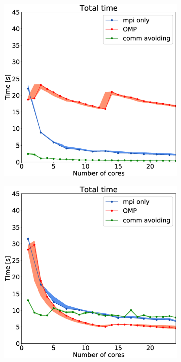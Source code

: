 \begin{figure}
\begin{subfigure}[c]{0.15\textwidth}
\includegraphics[width=\textwidth]{plots/50000our_impl}
\label{fig:mpi_omp_commavoiding_euler_1}
\end{subfigure}
\begin{subfigure}[c]{0.15\textwidth}
\includegraphics[width=\textwidth]{plots/10000our_impl}

\end{subfigure}
\end{figure}
